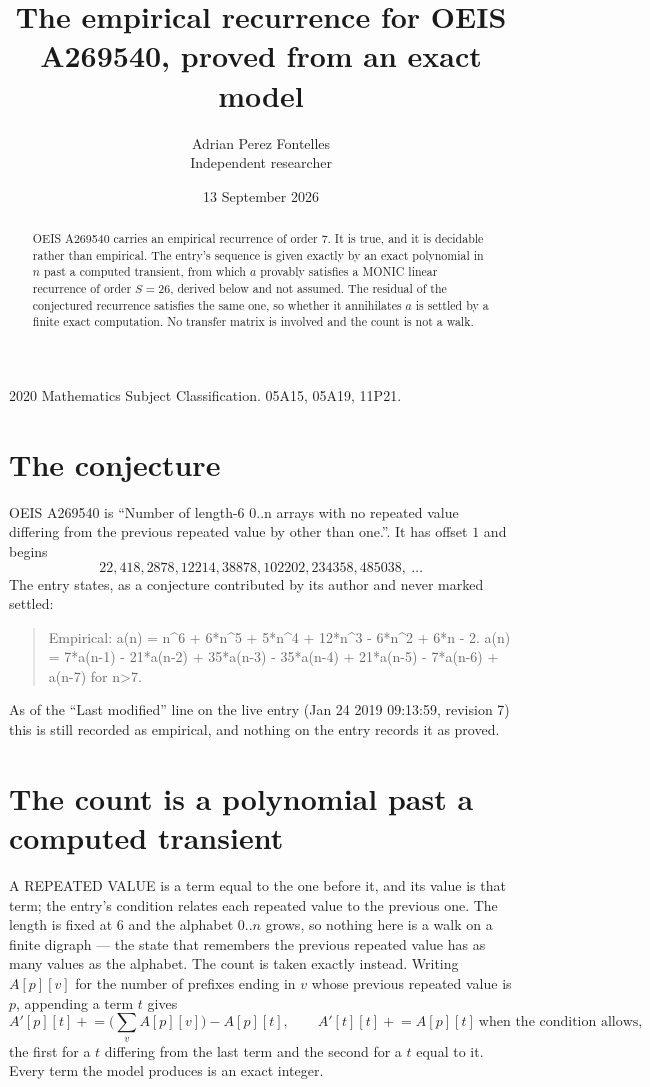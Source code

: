 \documentclass[11pt,a4paper]{article}
\title{The empirical recurrence for OEIS A269540, proved from an exact model}
\author{Adrian Perez Fontelles\\ \small Independent researcher}
\date{13 September 2026}
\theoremstyle{plain}
\theoremstyle{definition}
\begin{document}
\maketitle

\begin{abstract}
OEIS A269540 carries an empirical recurrence of order $7$. It is true, and it is
decidable rather than empirical. The entry's sequence is given exactly by an exact polynomial in $n$ past a computed transient, from
which $a$ provably satisfies a MONIC linear recurrence of order $S=26$, derived below and not
assumed. The residual of the conjectured recurrence satisfies the same one, so whether it
annihilates $a$ is settled by a finite exact computation. No transfer matrix is involved and
the count is not a walk.
\end{abstract}

\noindent\small 2020 Mathematics Subject Classification. 05A15, 05A19, 11P21.\normalsize

\section{The conjecture}

OEIS A269540 is ``Number of length-6 0..n arrays with no repeated value differing from the previous repeated value by other than one.''. It has offset $1$ and begins
\[
22, 418, 2878, 12214, 38878, 102202, 234358, 485038,\ \dots
\]
The entry states, as a conjecture contributed by its author and never marked settled:
\begin{quote}
Empirical: a(n) = n\^{}6 + 6*n\^{}5 + 5*n\^{}4 + 12*n\^{}3 - 6*n\^{}2 + 6*n - 2. a(n) = 7*a(n-1) - 21*a(n-2) + 35*a(n-3) - 35*a(n-4) + 21*a(n-5) - 7*a(n-6) + a(n-7) for n>7.
\end{quote}
As of the ``Last modified'' line on the live entry (Jan 24 2019 09:13:59, revision 7)
this is still recorded as empirical, and nothing on the entry records it as proved.

\section{The count is a polynomial past a computed transient}

A REPEATED VALUE is a term equal to the one before it, and its value is that term; the entry's
condition relates each repeated value to the previous one. The length is fixed at $6$ and the
alphabet $0..n$ grows, so nothing here is a walk on a finite digraph --- the state that
remembers the previous repeated value has as many values as the alphabet. The count is taken
exactly instead. Writing $A[p][v]$ for the number of prefixes ending in $v$ whose previous
repeated value is $p$, appending a term $t$ gives
\[
A'[p][t] \mathrel{+}= \Big(\sum_v A[p][v]\Big) - A[p][t],
\qquad
A'[t][t] \mathrel{+}= A[p][t]\ \text{when the condition allows},
\]
the first for a $t$ differing from the last term and the second for a $t$ equal to it. Every
term the model produces is an exact integer.
\end{document}
